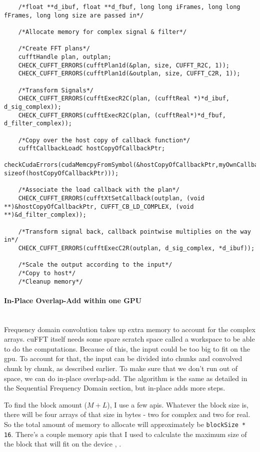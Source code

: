 \begin{verbatim}
    /*float **d_ibuf, float **d_fbuf, long long iFrames, long long fFrames, long long size are passed in*/
    
    /*Allocate memory for complex signal & filter*/
    
    /*Create FFT plans*/
    cufftHandle plan, outplan;
    CHECK_CUFFT_ERRORS(cufftPlan1d(&plan, size, CUFFT_R2C, 1));
    CHECK_CUFFT_ERRORS(cufftPlan1d(&outplan, size, CUFFT_C2R, 1));
	
    /*Transform Signals*/
    CHECK_CUFFT_ERRORS(cufftExecR2C(plan, (cufftReal *)*d_ibuf, d_sig_complex));
    CHECK_CUFFT_ERRORS(cufftExecR2C(plan, (cufftReal*)*d_fbuf, d_filter_complex));
	
    /*Copy over the host copy of callback function*/
    cufftCallbackLoadC hostCopyOfCallbackPtr;
    checkCudaErrors(cudaMemcpyFromSymbol(&hostCopyOfCallbackPtr,myOwnCallbackPtr, sizeof(hostCopyOfCallbackPtr)));
	
    /*Associate the load callback with the plan*/
    CHECK_CUFFT_ERRORS(cufftXtSetCallback(outplan, (void **)&hostCopyOfCallbackPtr, CUFFT_CB_LD_COMPLEX, (void **)&d_filter_complex));

    /*Transform signal back, callback pointwise multiplies on the way in*/
    CHECK_CUFFT_ERRORS(cufftExecC2R(outplan, d_sig_complex, *d_ibuf));
	
    /*Scale the output according to the input*/
    /*Copy to host*/
    /*Cleanup memory*/
\end{verbatim}
\paragraph{In-Place Overlap-Add within one GPU} \hspace{0pt} \\
\indent Frequency domain convolution takes up extra memory to account for the complex arrays. cuFFT itself needs some spare scratch space called a workspace to be able to do the computations. Because of this, the input could be too big to fit on the \gls{gpu}. To account for that, the input can be divided into chunks and convolved chunk by chunk, as described earlier. To make sure that we don't run out of space, we can do in-place overlap-add. The algorithm is the same as detailed in the Sequential Frequency Domain section, but in-place adds more steps.

To find the block amount ($M + L$), I use a few \glspl{api}. Whatever the block size is, there will be four arrays of that size in bytes - two for complex and two for real. So the total amount of memory to allocate will approximately be \verb|blockSize * 16|. There's a couple memory \glspl{api} that I used to calculate the maximum size of the block that will fit on the device \citep{cufft}, \citep{cudaC}.

